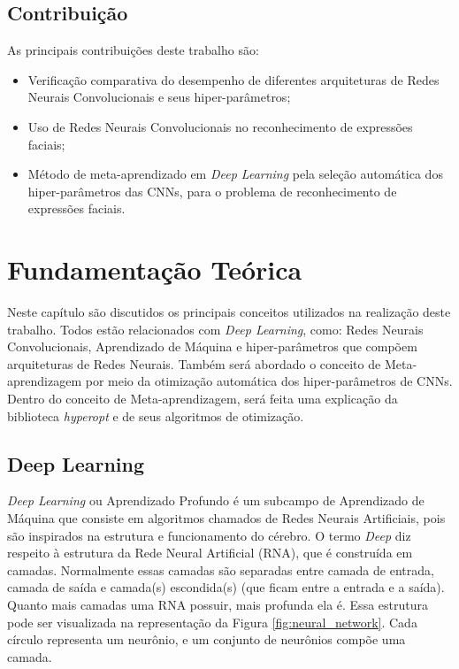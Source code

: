 \documentclass[
12pt,				%
openright,			%
oneside,			%
a4paper,			%
english,			%
french,				%
spanish,			%
brazil				%
]{abntex2}
\begin{document}
\section{Contribuição} \label{contribuicao}

As principais contribuições deste trabalho são:

\begin{itemize}
    \item Verificação comparativa do desempenho de diferentes arquiteturas de Redes Neurais Convolucionais e seus hiper-parâmetros;
    \item Uso de Redes Neurais Convolucionais no reconhecimento de expressões faciais;
    \item Método de meta-aprendizado em \textit{Deep Learning} pela seleção automática dos hiper-parâmetros das CNNs, para o problema de reconhecimento de expressões faciais.
\end{itemize}


 

\chapter{Fundamentação Teórica} \label{fundamentacao}

Neste capítulo são discutidos os principais conceitos utilizados na realização deste trabalho. Todos estão relacionados com \textit{Deep Learning}, como: Redes Neurais Convolucionais, Aprendizado de Máquina e hiper-parâmetros que compõem arquiteturas de Redes Neurais. Também será abordado o conceito de Meta-aprendizagem por meio da otimização automática dos hiper-parâmetros de CNNs. Dentro do conceito de Meta-aprendizagem, será feita uma explicação da biblioteca \textit{hyperopt} e de seus algoritmos de otimização.

\section{Deep Learning} \label{deeplearning}

\textit{Deep Learning} ou Aprendizado Profundo é um subcampo de Aprendizado de Máquina que consiste em algoritmos chamados de Redes Neurais Artificiais, pois são inspirados na estrutura e funcionamento do cérebro. O termo \textit{Deep} diz respeito à estrutura da Rede Neural Artificial (RNA), que é construída em camadas. Normalmente essas camadas são separadas entre camada de entrada, camada de saída e camada(s) escondida(s) (que ficam entre a entrada e a saída). Quanto mais camadas uma RNA possuir, mais profunda ela é. Essa estrutura pode ser visualizada na representação da Figura \ref{fig:neural_network}. Cada círculo representa um neurônio, e um conjunto de neurônios compõe uma camada.
\end{document}
